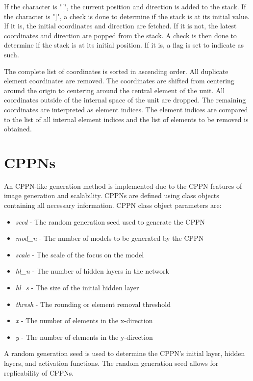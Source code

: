 If the character is "[", the current position and direction is added to the stack. If the character is "]", a check is done to determine if the stack is at its initial value. If it is, the initial coordinates and direction are fetched. If it is not, the latest coordinates and direction are popped from the stack. A check is then done to determine if the stack is at its initial position. If it is, a flag is set to indicate as such.

The complete list of coordinates is sorted in ascending order. All duplicate element coordinates are removed. The coordinates are shifted from centering around the origin to centering around the central element of the unit. All coordinates outside of the internal space of the unit are dropped. The remaining coordinates are interpreted as element indices. The element indices are compared to the list of all internal element indices and the list of elements to be removed is obtained.

\section{CPPNs}
\label{sec:CPPN}

An CPPN-like generation method is implemented due to the CPPN features of image generation and scalability. CPPNs are defined using class objects containing all necessary information. CPPN class object parameters are:

\begin{itemize}
	\item \textit{seed} - The random generation seed used to generate the CPPN
	\item \textit{mod\_n} - The number of models to be generated by the CPPN
	\item \textit{scale} - The scale of the focus on the model
	\item \textit{hl\_n} - The number of hidden layers in the network
	\item \textit{hl\_s} - The size of the initial hidden layer
	\item \textit{thresh} - The rounding or element removal threshold
	\item \textit{x} - The number of elements in the x-direction
	\item \textit{y} - The number of elements in the y-direction
\end{itemize}

A random generation seed is used to determine the CPPN's initial layer, hidden layers, and activation functions. The random generation seed allows for replicability of CPPNs.

